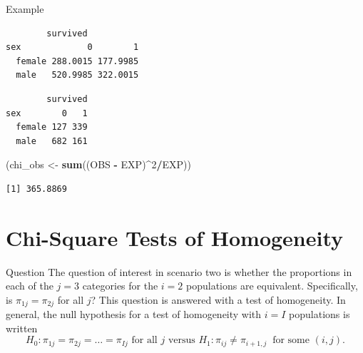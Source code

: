 \documentclass[
  ignorenonframetext,
]{beamer}
\newenvironment{Shaded}{\begin{snugshade}}{\end{snugshade}}
\newcommand{\DecValTok}[1]{\textcolor[rgb]{0.00,0.00,0.81}{#1}}
\newcommand{\FunctionTok}[1]{\textcolor[rgb]{0.13,0.29,0.53}{\textbf{#1}}}
\newcommand{\NormalTok}[1]{#1}
\newcommand{\OtherTok}[1]{\textcolor[rgb]{0.56,0.35,0.01}{#1}}
\newcommand{\SpecialCharTok}[1]{\textcolor[rgb]{0.81,0.36,0.00}{\textbf{#1}}}
\begin{document}
\begin{frame}[fragile]{Example}
\label{example-1}
\begin{Shaded}
\end{Shaded}

\begin{verbatim}
        survived
sex             0        1
  female 288.0015 177.9985
  male   520.9985 322.0015
\end{verbatim}

\begin{Shaded}
\end{Shaded}

\begin{verbatim}
        survived
sex        0   1
  female 127 339
  male   682 161
\end{verbatim}

\begin{Shaded}
\begin{Highlighting}[]
\NormalTok{(chi\_obs }\OtherTok{\textless{}{-}} \FunctionTok{sum}\NormalTok{((OBS }\SpecialCharTok{{-}}\NormalTok{ EXP)}\SpecialCharTok{\^{}}\DecValTok{2}\SpecialCharTok{/}\NormalTok{EXP))}
\end{Highlighting}
\end{Shaded}

\begin{verbatim}
[1] 365.8869
\end{verbatim}
\end{frame}

\section{Chi-Square Tests of
Homogeneity}\label{chi-square-tests-of-homogeneity}

\begin{frame}{Question}
\label{question}
The question of interest in scenario two is whether the proportions in
each of the \(j=3\) categories for the \(i=2\) populations are
equivalent. Specifically, is \(\pi_{1j} = \pi_{2j}\) for all \(j\)? This
question is answered with a test of homogeneity. In general, the null
hypothesis for a test of homogeneity with \(i=I\) populations is written
\begin{equation}
 H_0: \pi_{1j}=\pi_{2j} = \dots = \pi_{Ij}\text{ for all } j \text{ versus } H_1:
\pi_{ij} \ne \pi_{i+1, j} \: \text{ for some } (i, j).
\end{equation}
\end{frame}
\end{document}
